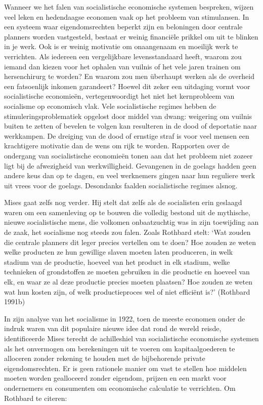 \documentclass[
  a5paper,
  smalldemyvopaper,11pt,twoside,onecolumn,openright,extrafontsizes,
hidelinks]{memoir}
\begin{document}
Wanneer we het falen van socialistische economische systemen bespreken,
wijzen veel leken en hedendaagse economen vaak op het probleem van
stimulansen. In een systeem waar eigendomsrechten beperkt zijn en
beloningen door centrale planners worden vastgesteld, bestaat er weinig
financiële prikkel om uit te blinken in je werk. Ook is er weinig
motivatie om onaangenaam en moeilijk werk te verrichten. Als iedereen
een vergelijkbare levensstandaard heeft, waarom zou iemand dan kiezen
voor het ophalen van vuilnis of het vele jaren trainen om hersenchirurg
te worden? En waarom zou men überhaupt werken als de overheid een
fatsoenlijk inkomen garandeert? Hoewel dit zeker een uitdaging vormt
voor socialistische economieën, vertegenwoordigt het niet het
kernprobleem van socialisme op economisch vlak. Vele socialistische
regimes hebben de stimuleringsproblematiek opgelost door middel van
dwang: weigering om vuilnis buiten te zetten of bevelen te volgen kan
resulteren in de dood of deportatie naar werkkampen. De dreiging van de
dood of ernstige straf is voor veel mensen een krachtigere motivatie dan
de wens om rijk te worden. Rapporten over de ondergang van
socialistische economieën tonen aan dat het probleem niet zozeer ligt
bij de afwezigheid van werkwilligheid. Gevangenen in de goelags hadden
geen andere keus dan op te dagen, en veel werknemers gingen naar hun
reguliere werk uit vrees voor de goelags. Desondanks faalden
socialistische regimes alsnog.

Mises gaat zelfs nog verder. Hij stelt dat zelfs als de socialisten erin
geslaagd waren om een samenleving op te bouwen die volledig bestond uit
de mythische, nieuwe socialistische mens, die volkomen onbaatzuchtig was
in zijn toewijding aan de zaak, het socialisme nog steeds zou falen.
Zoals Rothbard stelt: `Wat zouden die centrale planners dit leger
precies vertellen om te doen? Hoe zouden ze weten welke producten ze hun
gewillige slaven moeten laten produceren, in welk stadium van de
productie, hoeveel van het product in elk stadium, welke technieken of
grondstoffen ze moeten gebruiken in die productie en hoeveel van elk, en
waar ze al deze productie precies moeten plaatsen? Hoe zouden ze weten
wat hun kosten zijn, of welk productieproces wel of niet efficiënt is?'
(Rothbard 1991b)

In zijn analyse van het socialisme in 1922, toen de meeste economen
onder de indruk waren van dit populaire nieuwe idee dat rond de wereld
reisde, identificeerde Mises terecht de achilleshiel van socialistische
economische systemen als het onvermogen om berekeningen uit te voeren om
kapitaalgoederen te alloceren zonder rekening te houden met de
bijbehorende private eigendomsrechten. Er is geen rationele manier om
vast te stellen hoe middelen moeten worden gealloceerd zonder eigendom,
prijzen en een markt voor ondernemers en consumenten om economische
calculatie te verrichten. Om Rothbard te citeren:
\end{document}
